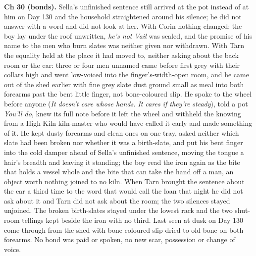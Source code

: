 \documentclass{design/chronicle}
\begin{document}
{\textbf{Ch 30 (bonds).} Sella’s unfinished sentence still arrived at the pot instead of at him on Day 130 and the household straightened around his silence; he did not answer with a word and did not look at her. With Corin nothing changed: the boy lay under the roof unwritten, \emph{he’s not Vail} was sealed, and the promise of his name to the men who burn slates was neither given nor withdrawn. With Tarn the equality held at the place it had moved to, neither asking about the back room or the ear: three or four men unnamed came before first grey with their collars high and went low-voiced into the finger’s-width-open room, and he came out of the shed earlier with fine grey slate dust ground small as meal into both forearms past the bent little finger, not bone-coloured slip. He spoke to the wheel before anyone (\emph{It doesn’t care whose hands. It cares if they’re steady}), told a pot \emph{You’ll do}, knew its full note before it left the wheel and withheld the knowing from a High Kiln kiln-master who would have called it early and made something of it. He kept dusty forearms and clean ones on one tray, asked neither which slate had been broken nor whether it was a birth-slate, and put his bent finger into the cold damper ahead of Sella’s unfinished sentence, moving the tongue a hair’s breadth and leaving it standing; the boy read the iron again as the bite that holds a vessel whole and the bite that can take the hand off a man, an object worth nothing joined to no kiln. When Tarn brought the sentence about the ear a third time to the word that would call the loan that night he did not ask about it and Tarn did not ask about the room; the two silences stayed unjoined. The broken birth-slates stayed under the lowest rack and the two shut-room tellings kept beside the iron with no third. Last seen at dusk on Day 130 come through from the shed with bone-coloured slip dried to old bone on both forearms. No bond was paid or spoken, no new scar, possession or change of voice.

}
\end{document}
